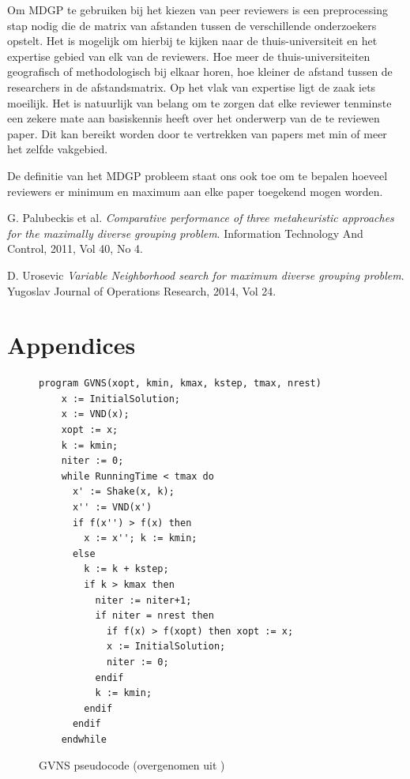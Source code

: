 \documentclass[pdftex,12pt,a4paper]{article}
\begin{document}
Om MDGP te gebruiken bij het kiezen van peer reviewers is een preprocessing stap nodig die de matrix van afstanden tussen de verschillende onderzoekers opstelt. Het is mogelijk om hierbij te kijken naar de thuis-universiteit en het expertise gebied van elk van de reviewers. Hoe meer de thuis-universiteiten geografisch of methodologisch bij elkaar horen, hoe kleiner de afstand tussen de researchers in de afstandsmatrix. Op het vlak van expertise ligt de zaak iets moeilijk. Het is natuurlijk van belang om te zorgen dat elke reviewer tenminste een zekere mate aan basiskennis heeft over het onderwerp van de te reviewen paper. Dit kan bereikt worden door te vertrekken van papers met min of meer het zelfde vakgebied.

De definitie van het MDGP probleem staat ons ook toe om te bepalen hoeveel reviewers er minimum en maximum aan elke paper toegekend mogen worden. 

\newpage
\begin{thebibliography}{9}
  G. Palubeckis et al.
  \emph{Comparative performance of three metaheuristic approaches
for the maximally diverse grouping problem}.
  Information Technology And Control, 2011, Vol 40, No 4.
  
 D. Urosevic
 \emph{Variable Neighborhood search for maximum diverse grouping problem}.
 Yugoslav Journal of Operations Research, 2014, Vol 24.

\end{thebibliography}

\newpage
\section{Appendices}
\begin{figure}[h]
\begin{verbatim}
program GVNS(xopt, kmin, kmax, kstep, tmax, nrest)
    x := InitialSolution;
    x := VND(x);
    xopt := x;
    k := kmin;
    niter := 0;
    while RunningTime < tmax do
      x' := Shake(x, k);
      x'' := VND(x')
      if f(x'') > f(x) then
        x := x''; k := kmin;
      else
        k := k + kstep;
        if k > kmax then
          niter := niter+1;
          if niter = nrest then
            if f(x) > f(xopt) then xopt := x;
            x := InitialSolution;
            niter := 0;
          endif
          k := kmin;
        endif
      endif
    endwhile
\end{verbatim}
\caption{GVNS pseudocode (overgenomen uit \cite{Urosevic})}
\label{apx:gvns_pseudocode}
\end{figure}
\end{document}
